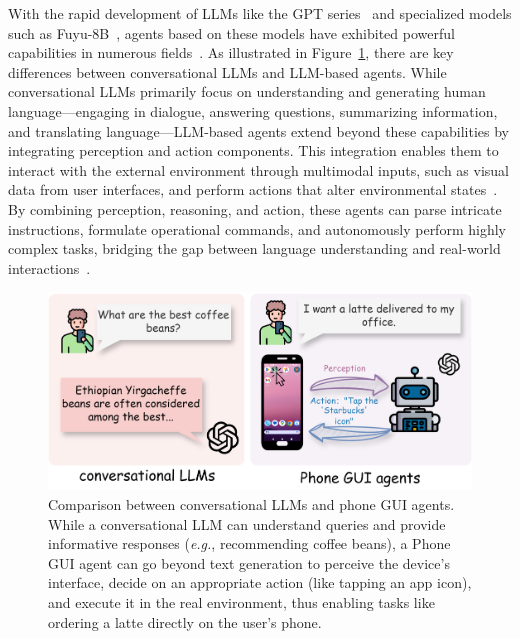 With the rapid development of LLMs like the GPT series~\cite{radford2018gpt1,radford2019gpt2,brown2020gpt3,achiam2023gpt} and specialized models such as Fuyu-8B~\cite{bavishi2023fuyu}, agents based on these models have exhibited powerful capabilities in numerous fields~\cite{wang2023voyager, hong2023metagpt, li2023camel, park2023generative, boiko2023emergent, qian2023communicative, xia2023towards, dasgupta2023collaborating, qian2024chatdev, dong2024self, goertzel2014artificial}. As illustrated in Figure~\ref{fig:llm_vs_agent}, there are key differences between conversational LLMs and LLM-based agents. While conversational LLMs primarily focus on understanding and generating human language—engaging in dialogue, answering questions, summarizing information, and translating language—LLM-based agents extend beyond these capabilities by integrating perception and action components. This integration enables them to interact with the external environment through multimodal inputs, such as visual data from user interfaces, and perform actions that alter environmental states~\cite{wang2023voyager,hong2023metagpt,qian2024chatdev}. By combining perception, reasoning, and action, these agents can parse intricate instructions, formulate operational commands, and autonomously perform highly complex tasks, bridging the gap between language understanding and real-world interactions~\cite{xi2023rise,li2024personal,guo2024large,furuta2024exposing}.

\begin{figure}[ht]
    \centering
    \includegraphics[width=0.99\linewidth]{figures/llm_vs_agent.drawio.png}
    \caption{Comparison between conversational LLMs and phone GUI agents. While a conversational LLM can understand queries and provide informative responses (\textit{e.g.}, recommending coffee beans), a Phone GUI agent can go beyond text generation to perceive the device’s interface, decide on an appropriate action (like tapping an app icon), and execute it in the real environment, thus enabling tasks like ordering a latte directly on the user’s phone.}
    \label{fig:llm_vs_agent}
\end{figure}

